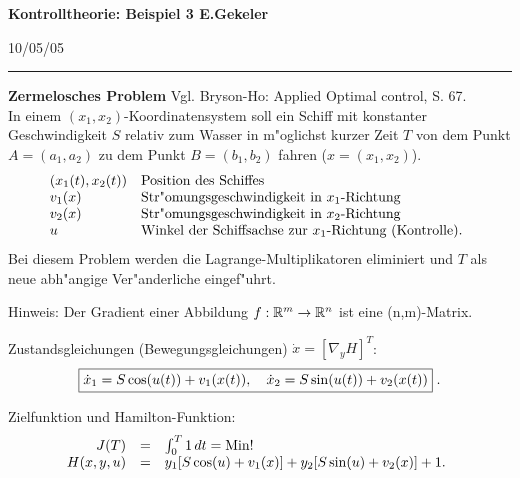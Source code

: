 \documentclass[12pt,a4paper,twoside,leqno]{article}
\newcommand{\Release}{10/05/05} %
\begin{document}
{\large\bf Kontrolltheorie: Beispiel 3 \hfill E.Gekeler}
\par
\vspace{-0.5ex}
\hfill{\footnotesize\Release\ }
\par\hrule\par\vspace{2ex}
{\bf Zermelosches Problem}
Vgl. {\sc Bryson-Ho}: Applied Optimal control, S. 67.\\
In einem
$(x_1,x_2)$-Koordinatensystem soll ein Schiff mit konstanter Geschwindigkeit
$S$ relativ zum Wasser in m"oglichst kurzer Zeit $T$ von dem Punkt $A =
(a_1,a_2)$ zu dem Punkt $B = (b_1,b_2)$ fahren ($x = (x_1,x_2)$).
\[
\ba{.}{ll}
(x_1(t),x_2(t))  & \mbox{Position des Schiffes}\\
v_1(x) & \mbox{Str"omungsgeschwindigkeit in $x_1$-Richtung}\\
v_2(x) & \mbox{Str"omungsgeschwindigkeit in $x_2$-Richtung}\\
u & \mbox{Winkel der Schiffsachse zur $x_1$-Richtung (Kontrolle)}.
\ea{.}
\]
Bei diesem Problem werden die {\sc Lagrange}-Multiplikatoren eliminiert und
$T$ als neue abh"angige Ver"anderliche eingef"uhrt.

Hinweis: Der Gradient einer Abbildung $f:\mb{R}^m \to \mb{R}^n$ ist eine
(n,m)-Matrix.

Zustandsgleichungen (Bewegungsgleichungen) $\dot{x} = [\nabla_y H]^T$:
\begin{equation} \label{1}
\fbox{$
\dot{x}_1 = S \cos(u(t)) + v_1(x(t)),\quad
\dot{x}_2 = S \sin(u(t)) + v_2(x(t))
$}\; .
\end{equation}

Zielfunktion und {\sc Hamilton}-Funktion:
\begin{equation} \label{2}
\ba{.}{rcl}
J(T) &=& \int_0^T1\, dt = \Min!\\
H(x,y,u) &=& y_1[S \cos(u) + v_1(x)] + y_2[S \sin(u) + v_2(x)] + 1.
\ea{.}
\end{equation}
\end{document}
